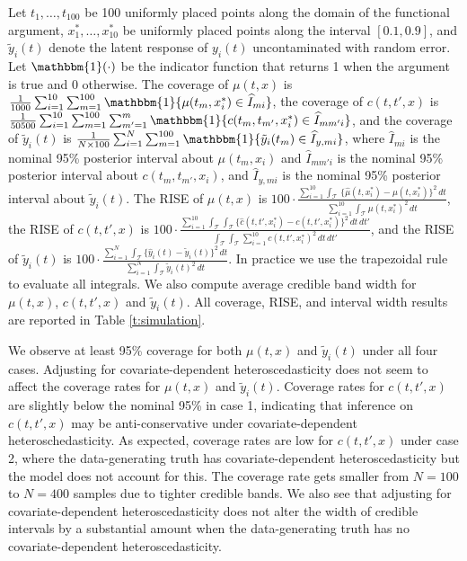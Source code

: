 \documentclass[useAMS,referee,usenatbib]{biom}
\begin{document}
Let $t_{1}, \ldots, t_{100}$ be 100 uniformly placed points along the domain of the functional argument, $x^{*}_{1},\ldots,x^{*}_{10}$ be uniformly placed points along the interval $[0.1, 0.9]$, and $\tilde{y}_{i}(t)$ denote the latent response of $y_{i}(t)$ uncontaminated with random error. Let $\mathbbm{1}(\cdot)$ be the indicator function that returns 1 when the argument is true and 0 otherwise. The coverage of $\mu(t, x)$ is $\frac{1}{1000}\sum_{i=1}^{10}\sum_{m=1}^{100}\mathbbm{1}\{\mu(t_{m}, x^{*}_{i}) \in \widehat{I}_{mi}\}$, the coverage of $c(t, t', x)$ is $\frac{1}{50500}\sum_{i=1}^{10}\sum_{m=1}^{100}\sum_{m'=1}^{m}\mathbbm{1}\{c(t_{m},t_{m'},x^{*}_{i})\in \widehat{I}_{mm'i}\}$, and the coverage of $\tilde{y}_{i}(t)$ is $\frac{1}{N\times 100}\sum_{i=1}^{N}\sum_{m=1}^{100}\mathbbm{1}\{\tilde{y}_{i}(t_{m}) \in \widehat{I}_{y,mi}\}$, where $\widehat{I}_{mi}$ is the nominal 95\% posterior interval about $\mu(t_{m}, x_{i})$ and $\widehat{I}_{mm'i}$ is the nominal 95\% posterior interval about $c(t_{m},t_{m'}, x_{i})$, and $\widehat{I}_{y,mi}$ is the nominal 95\% posterior interval about $\tilde{y}_{i}(t)$. The RISE of $\mu(t, x)$ is $100\cdot\frac{\sum_{i=1}^{10}\int_{\mathcal{T}}\,\{\widehat{\mu}(t, x^{*}_{i}) - \mu(t, x_{i}^{*})\}^{2}\,dt}{\sum_{i=1}^{10}\int_{\mathcal{T}}\mu(t, x_{i}^{*})^{2}\,dt}$, the RISE of $c(t, t', x)$ is $100 \cdot  \frac{\sum_{i=1}^{10}\int_{\mathcal{T}}\int_{\mathcal{T}}\{\widehat{c}(t,t', x_{i}^{*})-c(t,t',x_{i}^{*})\}^{2}\,dt\,dt'}{\int_{\mathcal{T}}\int_{\mathcal{T}}\sum_{i=1}^{10}c(t,t',x_{i}^{*})^{2}\,dt\,dt'}$, and the RISE of $\tilde{y}_{i}(t)$ is $100\cdot \frac{\sum_{i=1}^{N}\int_{\mathcal{T}}\{\widehat{y}_{i}(t)-\tilde{y}_{i}(t)\}^{2}\,dt}{\sum_{i=1}^{N}\int_{\mathcal{T}}\tilde{y}_{i}(t)^{2}\,dt}$. In practice we use the trapezoidal rule to evaluate all integrals. We also compute average credible band width for $\mu(t, x)$, $c(t, t', x)$ and $\tilde{y}_{i}(t)$. All coverage, RISE, and interval width results are reported in Table \ref{t:simulation}.

We observe at least 95\% coverage for both $\mu(t, x)$ and $\tilde{y}_{i}(t)$ under all four cases. Adjusting for covariate-dependent heteroscedasticity does not seem to affect the coverage rates for $\mu(t, x)$ and $\tilde{y}_{i}(t)$. Coverage rates for $c(t, t', x)$ are slightly below the nominal 95\% in case 1, indicating that inference on $c(t, t', x)$ may be anti-conservative under covariate-dependent heteroschedasticity. As expected, coverage rates are low for $c(t, t', x)$ under case 2, where the data-generating truth has covariate-dependent heteroscedasticity but the model does not account for this. The coverage rate gets smaller from $N=100$ to $N=400$ samples due to tighter credible bands. We also see that adjusting for covariate-dependent heteroscedasticity does not alter the width of credible intervals by a substantial amount when the data-generating truth has no covariate-dependent heteroscedasticity. 
\end{document}
